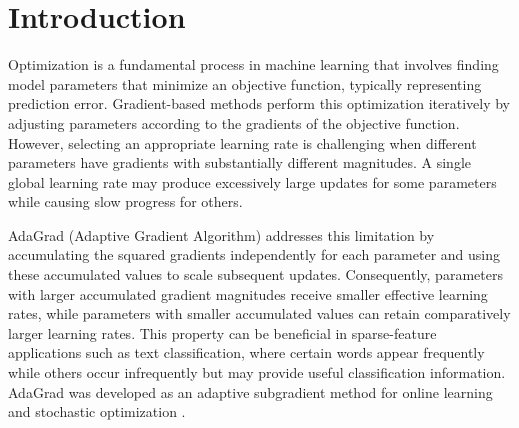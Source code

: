 \documentclass[11pt,a4paper]{article}
\begin{document}
\begin{abstract}
AdaGrad (Adaptive Gradient Algorithm) is a first-order optimization method designed to adjust learning rates independently for individual model parameters. Unlike conventional gradient descent, which typically applies a common learning rate, AdaGrad accumulates the squared gradients of each parameter and uses this history to scale subsequent updates. This mechanism can be particularly useful in learning problems involving sparse features or substantially different gradient magnitudes. This project investigates AdaGrad using a two-dimensional quadratic objective function with unequal curvature along its coordinate axes. A Python-based interactive visualization is developed to illustrate the parameter trajectory, objective value, accumulated squared gradients, and coordinate-wise effective learning rates across successive iterations. The experiment is intended to examine how gradient history influences update magnitudes and optimization behaviour. A key limitation of AdaGrad is that its accumulated squared gradients never decrease, causing effective learning rates to shrink over time. Consequently, parameter updates may become excessively small, potentially slowing further optimization progress. The analysis evaluates these characteristics using the numerical trace and graphical outputs generated by the implementation.
\end{abstract}

\tableofcontents
\newpage

\section{Introduction}

Optimization is a fundamental process in machine learning that involves finding model parameters that minimize an objective function, typically representing prediction error. Gradient-based methods perform this optimization iteratively by adjusting parameters according to the gradients of the objective function. However, selecting an appropriate learning rate is challenging when different parameters have gradients with substantially different magnitudes. A single global learning rate may produce excessively large updates for some parameters while causing slow progress for others.

AdaGrad (Adaptive Gradient Algorithm) addresses this limitation by accumulating the squared gradients independently for each parameter and using these accumulated values to scale subsequent updates. Consequently, parameters with larger accumulated gradient magnitudes receive smaller effective learning rates, while parameters with smaller accumulated values can retain comparatively larger learning rates. This property can be beneficial in sparse-feature applications such as text classification, where certain words appear frequently while others occur infrequently but may provide useful classification information. AdaGrad was developed as an adaptive subgradient method for online learning and stochastic optimization \cite{duchi2011}.
\end{document}
